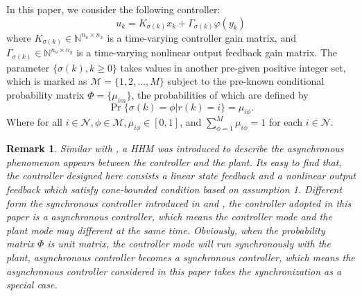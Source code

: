 \documentclass[conference]{IEEEtran}
\newtheorem{remark}{Remark}
\begin{document}
In this paper, we consider the following controller:
\begin{equation}\label{asycontroller}
u_k=K_{\sigma(k)}x_k+\varGamma_{\sigma(k)}\varphi(y_k) 
\end{equation}
where $K_{\sigma(k)}\in \mathbb{N}^{n_u\times n_x}$ is a time-varying controller gain matrix, and $\varGamma_{\sigma(k)}\in \mathbb{N}^{n_u\times n_y}$ is a time-varying nonlinear output feedback gain matrix. The parameter $\{\sigma(k),k\geq0\}$ takes values in another pre-given positive integer set, which is marked as $\mathcal{M}=\{1,2,\dots,M\}$ subject to the pre-known conditional probability matrix $\varPhi=\{\mu_{im} \}$, the probabilities of which are defined by
\begin{equation}
\Pr\{\sigma(k)=\phi|r(k)=i\}=\mu_{i\phi}.
\end{equation}
Where for all $i\in\mathcal{N}, \phi\in\mathcal{M}, \mu_{i\phi}\in [0,1]$, and $\sum_{\phi=1}^{M}\mu_{i\phi}=1$ for each $i\in\mathcal{N}$.
\begin{remark}
	Similar with \cite{passive_wu}, a HHM was introduced to describe the asynchronous phenomenon appears between the controller and the plant. Its easy to find that, the controller designed here consists a linear state feedback and a nonlinear output feedback which satisfy cone-bounded condition based on assumption 1. Different form the synchronous controller introduced in \cite{song_control} and \cite{costaolv_control_1}, the controller adopted in this paper is a asynchronous controller, which means the controller mode and the plant mode may different at the same time. Obviously, when the probability matrix $\varPhi$ is unit matrix, the controller mode will run synchronously with the plant, asynchronous controller becomes a synchronous controller, which means the asynchronous controller considered in this paper takes the synchronization as a special case. 
\end{remark} 
\end{document}
